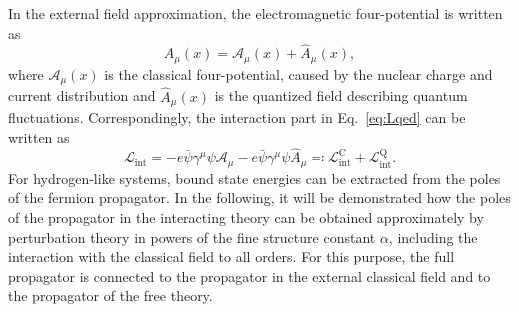 In the external field approximation, the electromagnetic four-potential is written as
\begin{equation}
A_\mu(x) = \mathcal{A}_\mu(x) + \hat{A}_\mu(x),
\end{equation}
where $\mathcal{A}_\mu(x)$ is the classical four-potential, caused by the nuclear charge and current distribution and $\hat{A}_\mu(x)$ is the quantized field describing quantum fluctuations. Correspondingly, the interaction part in Eq.~\eqref{eq:Lqed} can be written as
\begin{equation}
\label{eq:Lint}
\mathcal{L}_{\text{int}}=-e\bar{\psi}\gamma^\mu \psi \mathcal{A}_\mu-e\bar{\psi}\gamma^\mu \psi \hat{A}_\mu\eqqcolon\mathcal{L}_{\text{int}}^{\text{C}} + \mathcal{L}_{\text{int}}^{\text{Q}}.
\end{equation}
For hydrogen-like systems, bound state energies can be extracted from the poles of the fermion propagator. In the following, it will be demonstrated how the poles of the propagator in the interacting theory can be obtained approximately by perturbation theory in powers of the fine structure constant $\alpha$, including the interaction with the classical field to all orders. For this purpose, the full propagator is connected to the propagator in the external classical field and to the propagator of the free theory.
